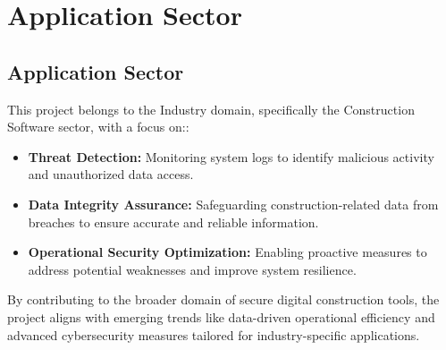 %
%

\chapter{Application Sector}

\section{Application Sector}

This project belongs to the Industry domain, specifically the Construction Software sector, with a focus on::

\begin{itemize}
	\item \textbf{Threat Detection:} Monitoring system logs to identify malicious activity and unauthorized data access.
	\item \textbf{Data Integrity Assurance:} Safeguarding construction-related data from breaches to ensure accurate and reliable information.
	\item \textbf{Operational Security Optimization:} Enabling proactive measures to address potential weaknesses and improve system resilience.
\end{itemize}
  
By contributing to the broader domain of secure digital construction tools, the project aligns with emerging trends like data-driven operational efficiency and advanced cybersecurity measures tailored for industry-specific applications.